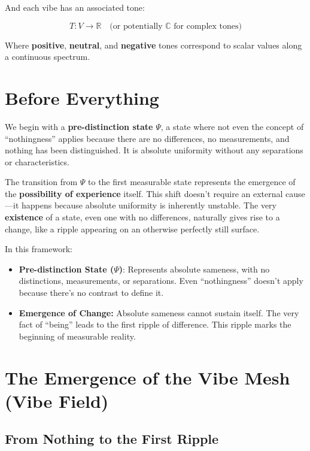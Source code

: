 \documentclass{article}
\begin{document}
And each vibe has an associated tone:

\[
T: V \rightarrow \mathbb{R} \quad \text{(or potentially } \mathbb{C} \text{ for complex tones)}
\]

Where \textbf{positive}, \textbf{neutral}, and \textbf{negative} tones correspond to scalar values along a continuous spectrum.

\section{Before Everything}

We begin with a \textbf{pre-distinction state} $\Psi$, a state where not even the concept of ``nothingness'' applies because there are no differences, no measurements, and nothing has been distinguished. It is absolute uniformity without any separations or characteristics.

The transition from $\Psi$ to the first measurable state represents the emergence of the \textbf{possibility of experience} itself. This shift doesn't require an external cause—it happens because absolute uniformity is inherently unstable. The very \textbf{existence} of a state, even one with no differences, naturally gives rise to a change, like a ripple appearing on an otherwise perfectly still surface.

In this framework:

\begin{itemize}
\item \textbf{Pre-distinction State ($\Psi$)}: Represents absolute sameness, with no distinctions, measurements, or separations. Even ``nothingness'' doesn't apply because there's no contrast to define it.
\item \textbf{Emergence of Change:} Absolute sameness cannot sustain itself. The very fact of ``being'' leads to the first ripple of difference. This ripple marks the beginning of measurable reality.
\end{itemize}

\section{The Emergence of the Vibe Mesh (Vibe Field)}

\subsection{From Nothing to the First Ripple}
\end{document}
